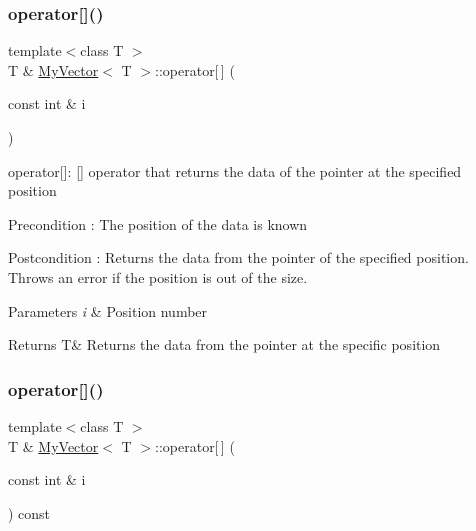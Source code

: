 \subsubsection{\texorpdfstring{operator[]()}{operator[]()}\hspace{0.1cm}{\footnotesize\ttfamily [1/2]}}
{\footnotesize\ttfamily template$<$class T $>$ \\
T \& \mbox{\hyperlink{class_my_vector}{My\+Vector}}$<$ T $>$\+::operator\mbox{[}$\,$\mbox{]} (\begin{DoxyParamCaption}\item[{const int \&}]{i }\end{DoxyParamCaption})}



operator\mbox{[}\mbox{]}\+: \mbox{[}\mbox{]} operator that returns the data of the pointer at the specified position 

\begin{DoxyPrecond}{Precondition}
\+: The position of the data is known 
\end{DoxyPrecond}
\begin{DoxyPostcond}{Postcondition}
\+: Returns the data from the pointer of the specified position. Throws an error if the position is out of the size. 
\end{DoxyPostcond}

\begin{DoxyParams}{Parameters}
{\em i} & Position number \\
\hline
\end{DoxyParams}
\begin{DoxyReturn}{Returns}
T\& Returns the data from the pointer at the specific position 
\end{DoxyReturn}
\mbox{\label{class_my_vector_a01d48c27ba17ad15aa29b2f039c303cd}} 
\subsubsection{\texorpdfstring{operator[]()}{operator[]()}\hspace{0.1cm}{\footnotesize\ttfamily [2/2]}}
{\footnotesize\ttfamily template$<$class T $>$ \\
T \& \mbox{\hyperlink{class_my_vector}{My\+Vector}}$<$ T $>$\+::operator\mbox{[}$\,$\mbox{]} (\begin{DoxyParamCaption}\item[{const int \&}]{i }\end{DoxyParamCaption}) const}



